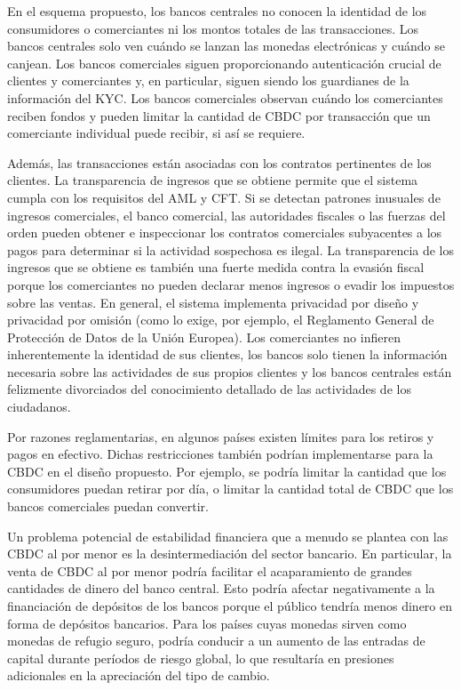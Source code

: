 \documentclass[10pt,spanish]{article}
\begin{document}
En el esquema propuesto, los bancos centrales no conocen la identidad de
los consumidores o comerciantes ni los montos totales de las
transacciones. Los bancos centrales solo ven cuándo se lanzan las
monedas electrónicas y cuándo se canjean. Los bancos comerciales siguen
proporcionando autenticación crucial de clientes y comerciantes y, en
particular, siguen siendo los guardianes de la información del KYC. Los
bancos comerciales observan cuándo los comerciantes reciben fondos y
pueden limitar la cantidad de CBDC por transacción que un comerciante
individual puede recibir, si así se requiere.

Además, las transacciones están asociadas con los contratos pertinentes
de los clientes. La transparencia de ingresos que se obtiene permite que
el sistema cumpla con los requisitos del AML y CFT. Si se detectan
patrones inusuales de ingresos comerciales, el banco comercial, las
autoridades fiscales o las fuerzas del orden pueden obtener e
inspeccionar los contratos comerciales subyacentes a los pagos para
determinar si la actividad sospechosa es ilegal. La transparencia de los
ingresos que se obtiene es también una fuerte medida contra la evasión
fiscal porque los comerciantes no pueden declarar menos ingresos o
evadir los impuestos sobre las ventas. En general, el sistema implementa
privacidad por diseño y privacidad por omisión (como lo exige, por
ejemplo, el Reglamento General de Protección de Datos de la Unión
Europea). Los comerciantes no infieren inherentemente la identidad de
sus clientes, los bancos solo tienen la información necesaria sobre las
actividades de sus propios clientes y los bancos centrales están
felizmente divorciados del conocimiento detallado de las actividades de
los ciudadanos.

Por razones reglamentarias, en algunos países existen límites para los
retiros y pagos en efectivo. Dichas restricciones también podrían
implementarse para la CBDC en el diseño propuesto. Por ejemplo, se
podría limitar la cantidad que los consumidores puedan retirar por día,
o limitar la cantidad total de CBDC que los bancos comerciales puedan
convertir.

Un problema potencial de estabilidad financiera que a menudo se plantea
con las CBDC al por menor es la desintermediación del sector bancario.
En particular, la venta de CBDC al por menor podría facilitar el
acaparamiento de grandes cantidades de dinero del banco central. Esto
podría afectar negativamente a la financiación de depósitos de los
bancos porque el público tendría menos dinero en forma de depósitos
bancarios. Para los países cuyas monedas sirven como monedas de refugio
seguro, podría conducir a un aumento de las entradas de capital durante
períodos de riesgo global, lo que resultaría en presiones adicionales en
la apreciación del tipo de cambio.
\end{document}

